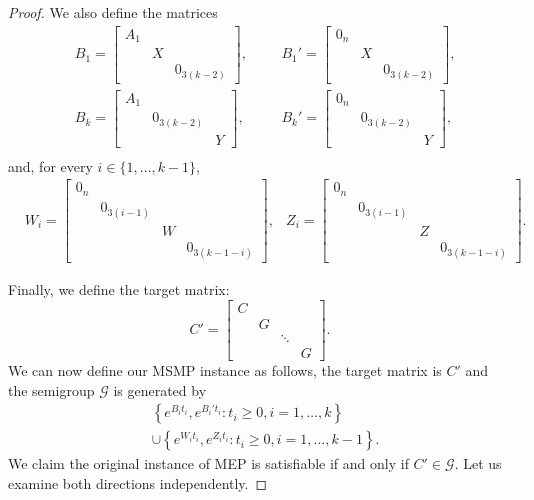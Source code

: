 \documentclass[format=acmsmall, review=false, screen=true]{acmart}
\begin{document}
\begin{proof}
We also define the matrices
\begin{align*}
&B_1=\begin{bmatrix}A_1&&\\&X&\\&&0_{3(k-2)}\end{bmatrix},&&
&B_1'=\begin{bmatrix}0_n&&\\&X&\\&&0_{3(k-2)}\end{bmatrix},\\[5pt]
&B_k=\begin{bmatrix}A_1&&\\&0_{3(k-2)}&\\&&Y\end{bmatrix},&&
&B_k'=\begin{bmatrix}0_n&&\\&0_{3(k-2)}&\\&&Y\end{bmatrix},\\
\end{align*}
and, for every $i\in\lbrace 1,\ldots,k-1\rbrace$,
\begin{align*}
&W_{i}=\begin{bmatrix}0_n&&&\\&0_{3(i-1)}&&\\&&W&\\&&&0_{3(k-1-i)}\end{bmatrix},
&Z_{i}=\begin{bmatrix}0_n&&&\\&0_{3(i-1)}&&\\&&Z&\\&&&0_{3(k-1-i)}\end{bmatrix}.
\end{align*}

Finally, we define the target matrix:
\[C'=\begin{bmatrix}C&&&\\&G&&\\&&\ddots&\\&&&G\end{bmatrix}.\]
We can now define our MSMP instance as follows, the target matrix is $C'$ and the semigroup $\mathcal{G}$
is generated by
\begin{align*}
&\left\lbrace e^{B_{i}t_{i}},e^{B_{i}'t_{i}}:t_{i}\geqslant0,i=1,\ldots,k\right\rbrace \\
&\cup\left\lbrace e^{W_{i}t_{i}},e^{Z_{i}t_{i}}:t_{i}\geqslant0,i=1,\ldots,k-1\right\rbrace.
\end{align*}
We claim the original instance of MEP is satisfiable if and only if $C'\in\mathcal{G}$.
Let us examine both directions independently.


\end{proof}
\end{document}
